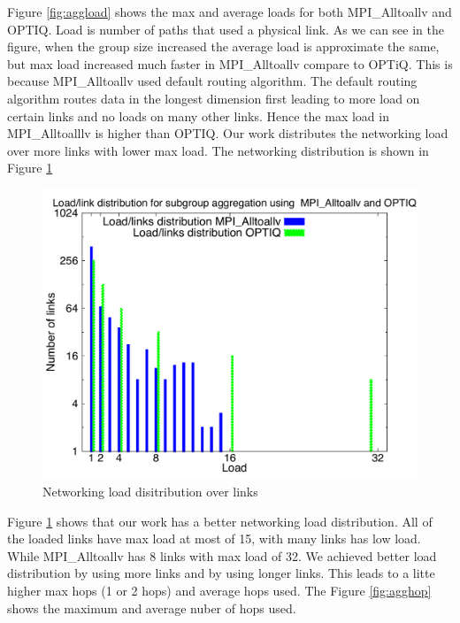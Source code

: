 Figure \ref{fig:aggload} shows the max and average loads for both MPI\_Alltoallv and OPTIQ. Load is number of paths that used a physical link. As we can see in the figure, when the group size increased the average load is approximate the same, but max load increased much faster in MPI\_Alltoallv compare to OPTiQ. This is because MPI\_Alltoallv used default routing algorithm. The default routing algorithm routes data in the longest dimension first leading to more load on certain links and no loads on many other links. Hence the max load in MPI\_Alltoalllv is higher than OPTIQ. Our work distributes the networking load over more links with lower max load. The networking distribution is shown in Figure \ref{fig:aggdist}

\begin{figure}[!htb]
\vspace{-0.1in}
\centering
\includegraphics[scale=0.30]{figures/distribution.pdf}
\vspace{-0.1in}
\caption{Networking load disitribution over links}
\vspace{-0.1in}
\label{fig:aggdist}
\end{figure}

Figure \ref{fig:aggdist} shows that our work has a better networking load distribution. All of the loaded links have max load at most of 15, with many links has low load. While MPI\_Alltoallv has 8 links with max load of 32. We achieved better load distribution by using more links and by using longer links. This leads to a litte higher max hops (1 or 2 hops) and average hops used. The Figure \ref{fig:agghop} shows the maximum and average nuber of hops used.

